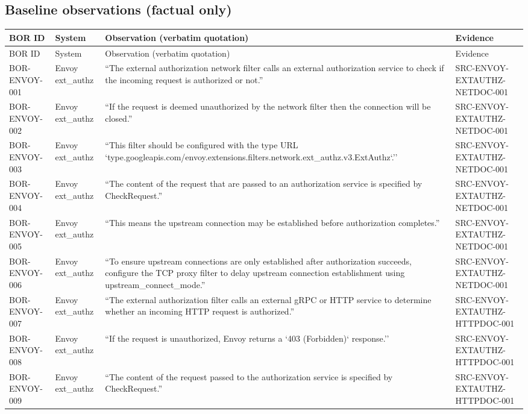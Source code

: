 \documentclass{article}
\begin{document}
\subsection*{Baseline observations (factual only)}
\begin{longtable}{@{}p{}p{}p{}p{}@{}}
\toprule
BOR ID & System & Observation (verbatim quotation) & Evidence\\
\midrule
\endfirsthead
\toprule
BOR ID & System & Observation (verbatim quotation) & Evidence\\
\midrule
\endhead
BOR-ENVOY-001 & Envoy ext\_authz & ``The external authorization network filter calls an external authorization service to check if the incoming request is authorized or not.'' & SRC-ENVOY-EXTAUTHZ-NETDOC-001\\
BOR-ENVOY-002 & Envoy ext\_authz & ``If the request is deemed unauthorized by the network filter then the connection will be closed.'' & SRC-ENVOY-EXTAUTHZ-NETDOC-001\\
BOR-ENVOY-003 & Envoy ext\_authz & ``This filter should be configured with the type URL `type.googleapis.com/envoy.extensions.filters.network.ext\_authz.v3.ExtAuthz`.'' & SRC-ENVOY-EXTAUTHZ-NETDOC-001\\
BOR-ENVOY-004 & Envoy ext\_authz & ``The content of the request that are passed to an authorization service is specified by CheckRequest.'' & SRC-ENVOY-EXTAUTHZ-NETDOC-001\\
BOR-ENVOY-005 & Envoy ext\_authz & ``This means the upstream connection may be established before authorization completes.'' & SRC-ENVOY-EXTAUTHZ-NETDOC-001\\
BOR-ENVOY-006 & Envoy ext\_authz & ``To ensure upstream connections are only established after authorization succeeds, configure the TCP proxy filter to delay upstream connection establishment using upstream\_connect\_mode.'' & SRC-ENVOY-EXTAUTHZ-NETDOC-001\\
BOR-ENVOY-007 & Envoy ext\_authz & ``The external authorization filter calls an external gRPC or HTTP service to determine whether an incoming HTTP request is authorized.'' & SRC-ENVOY-EXTAUTHZ-HTTPDOC-001\\
BOR-ENVOY-008 & Envoy ext\_authz & ``If the request is unauthorized, Envoy returns a `403 (Forbidden)` response.'' & SRC-ENVOY-EXTAUTHZ-HTTPDOC-001\\
BOR-ENVOY-009 & Envoy ext\_authz & ``The content of the request passed to the authorization service is specified by CheckRequest.'' & SRC-ENVOY-EXTAUTHZ-HTTPDOC-001\\

\end{longtable}
\end{document}
